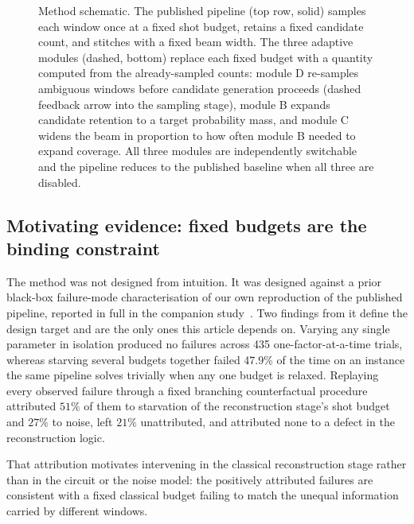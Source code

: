\documentclass[final,5p,times,longtitle]{elsarticle}
\newenvironment{widefigure}{\begin{figure}[tbp]}{\end{figure}}
\newenvironment{widefigure}{\begin{figure}[htbp]}{\end{figure}}
\begin{document}
\begin{widefigure}
{%
}
\caption{Method schematic. The published pipeline (top row, solid) samples
each window once at a fixed shot budget, retains a fixed candidate count,
and stitches with a fixed beam width. The three adaptive modules
(dashed, bottom) replace each fixed budget with a quantity computed from
the already-sampled counts: module D re-samples ambiguous windows before
candidate generation proceeds (dashed feedback arrow into the sampling
stage), module B expands candidate retention to a target probability
mass, and module C widens the beam in proportion to how often module B
needed to expand coverage. All three modules are independently
switchable and the pipeline reduces to the published baseline when all
three are disabled.}
\label{fig:schematic}
\end{widefigure}



\subsection{Motivating evidence: fixed budgets are the binding constraint}
\label{sec:motivation}

The method was not designed from intuition. It was designed against a prior
black-box failure-mode characterisation of our own reproduction of the
published pipeline, reported in full in the companion
study~\cite{companion}. Two findings from it define the design target and
are the only ones this article depends on. Varying any single parameter in
isolation produced no failures across 435 one-factor-at-a-time trials,
whereas starving several budgets together failed 47.9\% of the time on an
instance the same pipeline solves trivially when any one budget is relaxed.
Replaying every observed failure through a fixed branching counterfactual
procedure attributed $51\%$ of them to starvation of the reconstruction
stage's shot budget and $27\%$ to noise, left $21\%$ unattributed, and
attributed none to a defect in the reconstruction logic.

That attribution motivates intervening in the classical reconstruction
stage rather than in the circuit or the noise model: the positively
attributed failures are consistent with a fixed classical budget failing to
match the unequal information carried by different windows.
\end{document}
